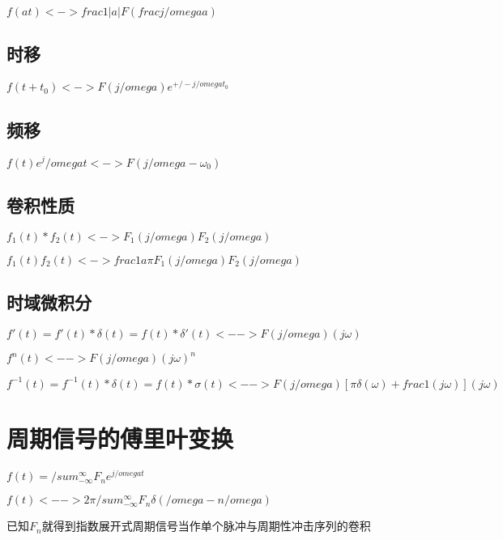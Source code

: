 \documentclass{article}
\begin{document}
$f(at)<->frac{1}{|a|}F(frac{j/omega}{a})$

\subsection{时移}

$f(t+t_0)<->F(j/omega)e^{+/-j/omega t_0}$

\subsection{频移}

$f(t)e^j/omega t<->F(j/omega - \omega_0)$

\subsection{卷积性质}

$f_1(t)*f_2(t)<->F_1(j/omega)F_2(j/omega)$

$f_1(t)f_2(t)<->frac{1}{a\pi}F_1(j/omega)F_2(j/omega)$

\subsection{时域微积分}

$f'(t)=f'(t)*\delta(t)=f(t)*\delta'(t)<-->F(j/omega)(j\omega)$

$f^n(t)<-->F(j/omega)(j\omega)^n$

$f^{-1}(t)=f^{-1}(t)*\delta(t)=f(t)*\sigma(t)<-->F(j/omega)[\pi \delta(\omega)+frac{1}{(j\omega)}](j\omega)$

\section{周期信号的傅里叶变换}

$f(t)=/sum_{-\infty}^{\infty}F_ne^{j/omega t}$

$f(t)<-->2\pi /sum_{-\infty}^{\infty} F_n\delta(/omega-n/omega)$

已知$F_n$就得到指数展开式周期信号当作单个脉冲与周期性冲击序列的卷积
\end{document}
